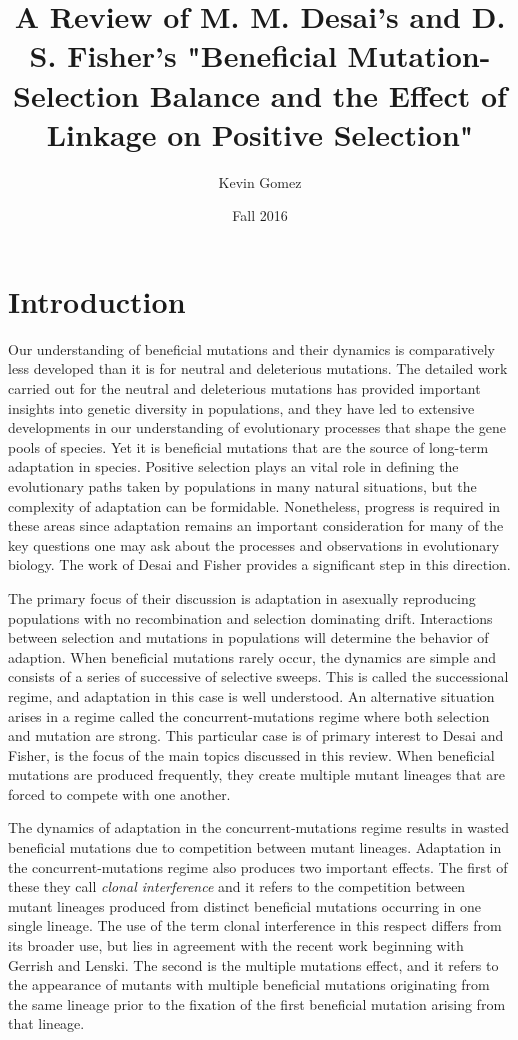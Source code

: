 \documentclass[12pt, two column]{article}
\title{A Review of M. M. Desai's and D. S. Fisher's "Beneficial Mutation-Selection Balance and the Effect of Linkage on Positive Selection"}
\date{Fall 2016}
\author{Kevin Gomez}
\begin{document}
\maketitle
\newpage


\newpage
\section*{Introduction}
Our understanding of beneficial mutations and their dynamics is comparatively less developed than it is for neutral and deleterious mutations.  The detailed work carried out for the neutral and deleterious mutations has provided important insights into genetic diversity in populations, and they have led to extensive developments in our understanding of evolutionary processes that shape the gene pools of species.  Yet it is beneficial mutations that are the source of long-term adaptation in species.  Positive selection plays an vital role in defining the evolutionary paths taken by populations in many natural situations, but the complexity of adaptation can be formidable.  Nonetheless, progress is required in these areas since adaptation remains an important consideration for many of the key questions one may ask about the processes and observations in evolutionary biology.  The work of Desai and Fisher provides a significant step in this direction.

The primary focus of their discussion is adaptation in asexually reproducing populations with no recombination and selection dominating drift.  Interactions between selection and mutations in populations will determine the behavior of adaption.  When beneficial mutations rarely occur, the dynamics are simple and consists of a series of successive of selective sweeps.  This is called the successional regime, and adaptation in this case is well understood.  An alternative situation arises in a regime called the concurrent-mutations regime where both selection and mutation are strong.  This particular case is of primary interest to Desai and Fisher, is the focus of the main topics discussed in this review.  When beneficial mutations are produced frequently, they create multiple mutant lineages that are forced to compete with one another.  

The dynamics of adaptation in the concurrent-mutations regime results in wasted beneficial mutations due to competition between mutant lineages.   Adaptation in the concurrent-mutations regime also produces two important effects.  The first of these they call \textit{clonal interference} and it refers to the competition between mutant lineages produced from distinct beneficial mutations occurring in one single lineage.  The use of the term clonal interference in this respect differs from its broader use, but lies in agreement with the recent work beginning with Gerrish and Lenski.  The second is the multiple mutations effect, and it refers to the appearance of mutants with multiple beneficial mutations originating from the same lineage prior to the fixation of the first beneficial mutation arising from that lineage.    
\end{document}
